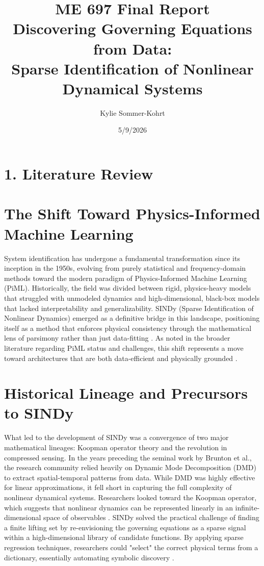\documentclass[12pt]{article}
\title{\textbf{ME 697 Final Report}\\[4pt]
\large Discovering Governing Equations from Data:\\
Sparse Identification of Nonlinear Dynamical Systems}
\author{Kylie Sommer-Kohrt}
\date{5/9/2026}
\begin{document}
\maketitle
\thispagestyle{empty}
\section*{1. Literature Review}

\section{The Shift Toward Physics-Informed Machine Learning}
System identification has undergone a fundamental transformation since its inception in the 1950s, evolving from purely statistical and frequency-domain methods toward the modern paradigm of Physics-Informed Machine Learning (PiML). Historically, the field was divided between rigid, physics-heavy models that struggled with unmodeled dynamics and high-dimensional, black-box models that lacked interpretability and generalizability. SINDy (Sparse Identification of Nonlinear Dynamics) emerged as a definitive bridge in this landscape, positioning itself as a method that enforces physical consistency through the mathematical lens of parsimony rather than just data-fitting \cite{Brunton2016}. As noted in the broader literature regarding PiML status and challenges, this shift represents a move toward architectures that are both data-efficient and physically grounded \cite{Zhang2025}.

\section{Historical Lineage and Precursors to SINDy}
What led to the development of SINDy was a convergence of two major mathematical lineages: Koopman operator theory and the revolution in compressed sensing. In the years preceding the seminal work by Brunton et al., the research community relied heavily on Dynamic Mode Decomposition (DMD) to extract spatial-temporal patterns from data. While DMD was highly effective for linear approximations, it fell short in capturing the full complexity of nonlinear dynamical systems. Researchers looked toward the Koopman operator, which suggests that nonlinear dynamics can be represented linearly in an infinite-dimensional space of observables \cite{Kutz2023}. SINDy solved the practical challenge of finding a finite lifting set by re-envisioning the governing equations as a sparse signal within a high-dimensional library of candidate functions. By applying sparse regression techniques, researchers could "select" the correct physical terms from a dictionary, essentially automating symbolic discovery \cite{Brunton2016}.
\end{document}
